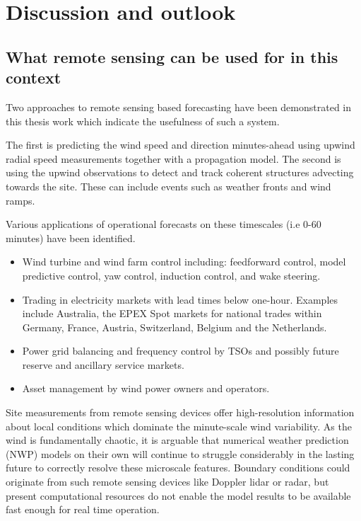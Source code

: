 \chapter{Discussion and outlook}
\label{sec:discussion}

\clearpage
\section{What remote sensing can be used for in this context}
\label{sec:discussion_rs}
\bigskip

Two approaches to remote sensing based forecasting have been demonstrated in this thesis work which indicate the usefulness of such a system.

The first is predicting the wind speed and direction minutes-ahead using upwind radial speed measurements together with a propagation model. The second is using the upwind observations to detect and track coherent structures advecting towards the site. These can include events such as weather fronts and wind ramps.

Various applications of operational forecasts on these timescales (i.e 0-60 minutes) have been identified.

\begin{itemize}
    \item Wind turbine and wind farm control including: feedforward control, model predictive control, yaw control, induction control, and wake steering.
    \item Trading in electricity markets with lead times below one-hour. Examples include Australia, the EPEX Spot markets for national trades within Germany, France, Austria, Switzerland, Belgium and the Netherlands.
    \item Power grid balancing and frequency control by TSOs and possibly future reserve and ancillary service markets.
    \item Asset management by wind power owners and operators.
\end{itemize}

Site measurements from remote sensing devices offer high-resolution information about local conditions which dominate the minute-scale wind variability. As the wind is fundamentally chaotic, it is arguable that numerical weather prediction (NWP) models on their own will continue to struggle considerably in the lasting future to correctly resolve these microscale features. Boundary conditions could originate from such remote sensing devices like Doppler lidar or radar, but present computational resources do not enable the model results to be available fast enough for real time operation.

